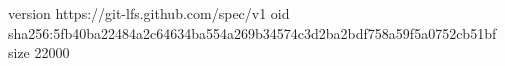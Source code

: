 version https://git-lfs.github.com/spec/v1
oid sha256:5fb40ba22484a2c64634ba554a269b34574c3d2ba2bdf758a59f5a0752cb51bf
size 22000
